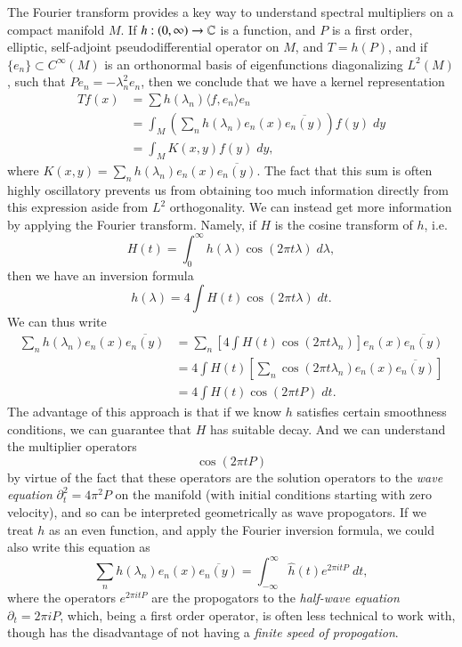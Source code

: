 The Fourier transform provides a key way to understand spectral multipliers on a compact manifold $M$. If $h: (0,\infty) \to \operatorname{\mathbb{C}}$ is a function, and $P$ is a first order, elliptic, self-adjoint pseudodifferential operator on $M$, and $T = h(P)$, and if $\{ e_n \} \subset C^\infty(M)$ is an orthonormal basis of eigenfunctions diagonalizing $L^2(M)$, such that $P e_n = - \lambda_n^2 e_n$, then we conclude that we have a kernel representation
%
\begin{align*}
    Tf(x) &= \sum h(\lambda_n) \langle f, e_n \rangle e_n\\
    &= \int_M \left( \sum_n h(\lambda_n) e_n(x) \overline{e_n(y)} \right) f(y)\; dy\\
    &= \int_M K(x,y) f(y)\; dy,
\end{align*}
%
where $K(x,y) = \sum_n h(\lambda_n) e_n(x) \overline{e_n(y)}$. The fact that this sum is often highly oscillatory prevents us from obtaining too much information directly from this expression aside from $L^2$ orthogonality. We can instead get more information by applying the Fourier transform. Namely, if $H$ is the cosine transform of $h$, i.e.
%
\[ H(t) = \int_0^\infty h(\lambda) \cos(2 \pi t \lambda)\; d\lambda, \]
%
then we have an inversion formula
%
\[ h(\lambda) = 4 \int H(t) \cos(2 \pi t \lambda)\; dt. \]
%
We can thus write
%
\begin{align*}
    \sum_n h(\lambda_n) e_n(x) \overline{e_n(y)} &= \sum_n \left[ 4 \int H(t) \cos(2 \pi t \lambda_n) \right] e_n(x) \overline{e_n(y)}\\
    &= 4 \int H(t) \left[ \sum_n \cos(2 \pi t \lambda_n) e_n(x) \overline{e_n(y)} \right]\\
    &= 4 \int H(t) \cos \left(2 \pi t P \right)\; dt.
\end{align*}
%
The advantage of this approach is that if we know $h$ satisfies certain smoothness conditions, we can guarantee that $H$ has suitable decay. And we can understand the multiplier operators
%
\[ \cos \left( 2 \pi t P \right) \]
%
by virtue of the fact that these operators are the solution operators to the \emph{wave equation} $\partial_t^2 = 4 \pi^2 P$ on the manifold (with initial conditions starting with zero velocity), and so can be interpreted geometrically as wave propogators. If we treat $h$ as an even function, and apply the Fourier inversion formula, we could also write this equation as
%
\[ \sum_n h(\lambda_n) e_n(x) \overline{e_n(y)} = \int_{-\infty}^\infty \widehat{h}(t) e^{2 \pi i t P}\; dt, \]
%
where the operators $e^{2 \pi i t P}$ are the propogators to the \emph{half-wave equation} $\partial_t = 2 \pi i P$, which, being a first order operator, is often less technical to work with, though has the disadvantage of not having a \emph{finite speed of propogation}.


